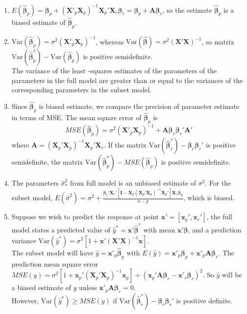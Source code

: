 \documentclass[11pt]{article}
\newcommand{\var}{\mathrm{Var}}
\theoremstyle{definition}
\begin{document}
\begin{enumerate}
  \item $E(\hat{\bm{\beta}}_p)=\bm{\beta}_p+(\bm{X}'_p\bm{X}_p)^{-1}\bm{X}_p'\bm{X}_r\bm{\beta}_r=\bm{\beta}_p+\bm{A}\bm{\beta}_r$, so the estimate $\hat{\bm{\beta}}_p$ is a biased estimate of $\hat{\bm{\beta}}_p$.
  \item $\var(\hat{\bm{\beta}}_p)=\sigma^2(\bm{X}'_p\bm{X}_p)^{-1}$, whereas $\var(\hat{\bm{\beta}})=\sigma^2(\bm{X}'\bm{X})^{-1}$, so matrix $\var(\hat{\bm{\beta}}_p^\ast)-\var(\hat{\bm{\beta}}_p)$ is positive semidefinite.\\
  The variance of the least -squares estimates of the parameters of the parameters in the full model are greater than or equal to the variances of the corresponding parameters in the subset model.
  \item Since $\hat{\bm{\beta}}_p$ is biased estimate, we compare the precision of parameter estimate in terms of MSE. The mean square error of $\hat{\bm{\beta}}_p$ is
  \[
MSE(\hat{\bm{\beta}}_p)=\sigma^2(\bm{X}'_p\bm{X}_p)^{-1}+\bm{A\beta}_r\bm{\beta}_r'\bm{A}'
  \]
where $\bm{A}=(\bm{X}_p'\bm{X}_p)^{-1}\bm{X}_p'\bm{X}_r$. If the matrix $\var(\hat{\bm{\beta}}_r^\ast)-\bm{\beta}_r\bm{\beta}_r'$ is positive semidefinite, the matrix $\var(\hat{\bm{\beta}}_p^\ast)-MSE(\hat{\bm{\beta}}_p)$ is positive semidefinite.
\item The parameters $\hat{\sigma}_\ast^2$ from full model is an unbiased estimate of $\sigma^2$. For the subset model, $E(\hat{\sigma}^2)=\sigma^2+\frac{\bm{\beta}_r'\bm{X}_r'[\bm{I}-\bm{X}_p(\bm{X}_p'\bm{X}_p)^{-1}\bm{X}_p']\bm{X}_r\bm{\beta_r}}{n-p}$, which is biased.
\item Suppose we wish to predict the response at point $\bm{x}'=[\bm{x}_p',\bm{x}_r']$, the full model states a predicted value of $\hat{y}^\ast=\bm{x}'\hat{\bm{\beta}}^\ast$ with mean $\bm{x}'\bm{\beta}$, and a prediction variance $\var(\hat{y}^\ast)=\sigma^2[1+\bm{x}'(\bm{X}'\bm{X})^{-1}\bm{x}]$.\\
The subset model will have $\hat{y}=\bm{x}'_p\hat{\bm{\beta}}_p$ with $E(\hat{y})=\bm{x}'_p\bm{\beta}_p+\bm{x}'_p\bm{A\beta}_r$. The prediction mean square error $MSE(\hat{y})=\sigma^2[1+\bm{x}_p'(\bm{X}_p'\bm{X}_p)^{-1}\bm{x}_p]+(\bm{x}_p'\bm{A\beta}_r-\bm{x}'_r\bm{\beta}_r)^2$. So $\hat{y}$ will be a biased estimate of $y$ unless $\bm{x}'_p\bm{A\beta}_r=0$.\\However, $\var(\hat{y}^\ast)\geq MSE(\hat{y})$ if $\var(\hat{\bm{\beta}}_r^\ast)-\bm{\beta}_r\bm{\beta}_r'$ is positive definite.
\end{enumerate}
\end{document}
